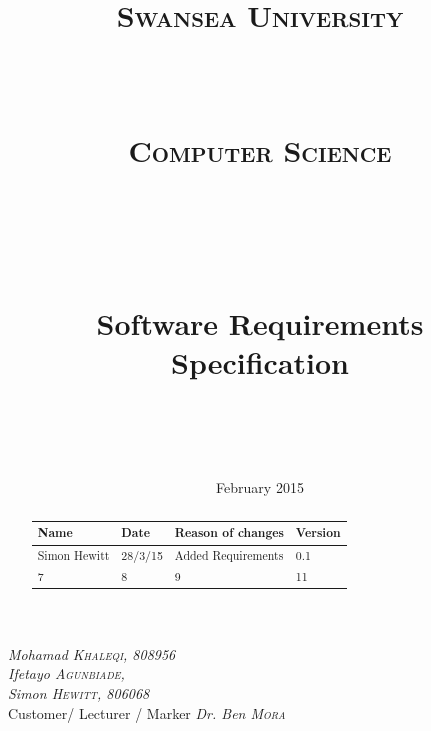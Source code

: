 \documentclass[a4paper,10pt]{article}
\title{	
\normalfont \normalsize 
\begin{LARGE} \textsc{Swansea University} \end{LARGE} \\ [15pt] %
\begin{large} \textsc{Computer Science} \end{large} \\ [15pt] %
\vspace{50px}
\horrule{0.5pt} \\[0.4cm] %
\begin{Huge}Software Requirements Specification \end{Huge}%
\horrule{2pt} \\[0.5cm] %
}
\author{} %
\date{} %
\begin{document}
\begin{titlepage}
\maketitle
\vspace{50px}
\begin{flushleft}
  \textit{Mohamad \textsc{Khaleqi}, 808956} \\
  \textit{Ifetayo \textsc{Agunbiade}, } \\
 \textit{Simon \textsc{Hewitt}, 806068} \\
  \hfill Customer/ Lecturer / Marker \textit{Dr. Ben \textsc{Mora}}
\end{flushleft}
\vfill
\center \date{\normalsize February 2015} %

\end{titlepage}
\pagebreak


\tableofcontents
\pagebreak
\justify


\renewcommand{\abstractname}{Revision History}
\begin{abstract}
\begin{center}
  \begin{tabular}{ |  p{3cm} | p{3cm} |  p{5cm} | p{2cm} |}
    \hline
    Name & Date & Reason of changes & Version \\ \hline \hline
    Simon Hewitt & 28/3/15 & Added Requirements & 0.1 \\ \hline 
    7 & 8 & 9 & 11 \\
    \hline
  \end{tabular}
\end{center}
\end{abstract}
\end{document}
